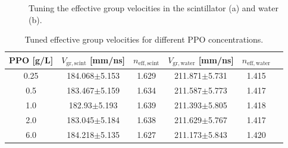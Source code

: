 \begin{figure}[htbp]
		\caption[Tuning the effective group velocities in the scintillator and water.]{Tuning the effective group velocities in the scintillator (a) and water (b).\label{fig:scint_groupVelocity}}
\end{figure}

\begin{table}[ht]
	\centering
	\caption{\label{partial_groupV}Tuned effective group velocities for different PPO concentrations.}	
	{\centering
		\begin{tabular*}{140mm}{c@{\extracolsep{\fill}}ccccc}
			\toprule 
			PPO [g/L] & $V_\mathrm{gr,scint}$ [mm/ns]& $n_\mathrm{eff,scint}$ & $V_\mathrm{gr,water}$ [mm/ns]& $n_\mathrm{eff,water}$\\
			\midrule
			0.25 & 184.068$\pm$5.153 & 1.629 & 211.871$\pm$5.731 & 1.415\\
			0.5  & 183.467$\pm$5.159 &1.634& 211.587$\pm$5.773 & 1.417 \\
			1.0 & 182.93$\pm$5.193 &1.639& 211.393$\pm$5.805& 1.418 \\
			2.0 & 183.045$\pm$5.184& 1.638& 211.629$\pm$5.767 & 1.417	\\
			6.0 & 184.218$\pm$5.135& 1.627& 211.173$\pm$5.843 &1.420\\
			\bottomrule	
		\end{tabular*}
	}
\end{table}

